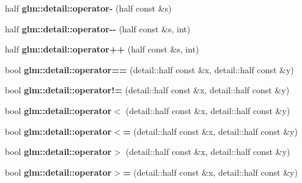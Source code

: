 \begin{DoxyCompactItemize}
\item 
\hypertarget{namespaceglm_1_1detail_ad5b647da2740caf9952963ef8f83e25c}{half {\bfseries glm\-::detail\-::operator-\/} (half const \&s)}\label{namespaceglm_1_1detail_ad5b647da2740caf9952963ef8f83e25c}

\item 
\hypertarget{namespaceglm_1_1detail_a47c575836608a210c271d8e9ae4ce100}{half {\bfseries glm\-::detail\-::operator-\/-\/} (half const \&s, int)}\label{namespaceglm_1_1detail_a47c575836608a210c271d8e9ae4ce100}

\item 
\hypertarget{namespaceglm_1_1detail_a4249333cb751ad58be862ace76b9ca75}{half {\bfseries glm\-::detail\-::operator++} (half const \&s, int)}\label{namespaceglm_1_1detail_a4249333cb751ad58be862ace76b9ca75}

\item 
\hypertarget{namespaceglm_1_1detail_a06e2e65ba3b1b8fbf4bd36fa162d1291}{bool {\bfseries glm\-::detail\-::operator==} (detail\-::half const \&x, detail\-::half const \&y)}\label{namespaceglm_1_1detail_a06e2e65ba3b1b8fbf4bd36fa162d1291}

\item 
\hypertarget{namespaceglm_1_1detail_a3fe68870255106305088d5c273f70efa}{bool {\bfseries glm\-::detail\-::operator!=} (detail\-::half const \&x, detail\-::half const \&y)}\label{namespaceglm_1_1detail_a3fe68870255106305088d5c273f70efa}

\item 
\hypertarget{namespaceglm_1_1detail_a9f821b272dc39cf31c8a8038f17921f4}{bool {\bfseries glm\-::detail\-::operator$<$} (detail\-::half const \&x, detail\-::half const \&y)}\label{namespaceglm_1_1detail_a9f821b272dc39cf31c8a8038f17921f4}

\item 
\hypertarget{namespaceglm_1_1detail_a24edd3f0ef3858bc7ba1af612906ec9d}{bool {\bfseries glm\-::detail\-::operator$<$=} (detail\-::half const \&x, detail\-::half const \&y)}\label{namespaceglm_1_1detail_a24edd3f0ef3858bc7ba1af612906ec9d}

\item 
\hypertarget{namespaceglm_1_1detail_a4a0c4141412655598450614b54cd312d}{bool {\bfseries glm\-::detail\-::operator$>$} (detail\-::half const \&x, detail\-::half const \&y)}\label{namespaceglm_1_1detail_a4a0c4141412655598450614b54cd312d}

\item 
\hypertarget{namespaceglm_1_1detail_aed4ce34912db5756cc5f1e41227c8930}{bool {\bfseries glm\-::detail\-::operator$>$=} (detail\-::half const \&x, detail\-::half const \&y)}\label{namespaceglm_1_1detail_aed4ce34912db5756cc5f1e41227c8930}

\end{DoxyCompactItemize}



